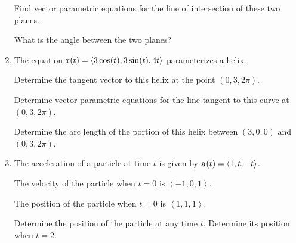 \documentclass[12pt]{article}
\begin{document}
\begin{enumerate}
Find vector parametric equations for the line of intersection of these two planes.

What is the angle between the two planes?

\newpage

\item   The equation ${\bf r}(t) = \left<3\cos(t),3\sin(t),4t\right>$ parameterizes a helix.

Determine the tangent vector to this helix at the point $(0,3,2\pi)$.

Determine vector parametric equations for the line tangent to this curve at $(0,3,2\pi)$.

Determine the arc length of the portion of this helix between $(3,0,0)$ and $(0,3,2\pi)$.

\newpage

\item  The acceleration of a particle at time $t$ is given by ${\bf a}(t) = \left<1,t,-t\right>$.

The velocity of the particle when $t=0$ is $\left<-1,0,1\right>$.

The position of the particle when $t=0$ is $\left<1,1,1\right>$.

Determine the position of the particle at any time $t$.  Determine its position when $t=2$.

\newpage





\end{enumerate}
\end{document}
